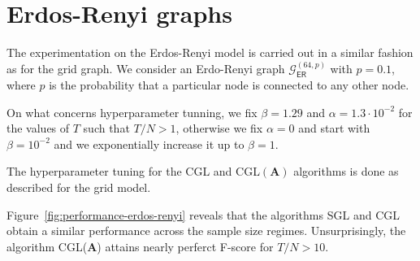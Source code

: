 \section{Erdos-Renyi graphs}
The experimentation on the Erdos-Renyi model is carried out in a similar fashion
as for the grid graph. We consider an Erdo-Renyi graph $\mathcal{G}^{(64, p)}_{\mathsf{ER}}$
with $p = 0.1$, where $p$ is the probability that a particular node is connected to any other node.

On what concerns hyperparameter tunning, we fix $\beta = 1.29$ and $\alpha = 1.3\cdot 10^{-2}$
for the values of $T$ such that $T / N > 1$, otherwise we fix $\alpha = 0$ and start with
$\beta = 10^{-2}$ and we exponentially increase it up to $\beta = 1$.

The hyperparameter tuning for the \textsf{CGL} and \textsf{CGL}$(\mathbf{A})$ algorithms
is done as described for the grid model.

Figure~\ref{fig:performance-erdos-renyi} reveals that the algorithms \textsf{SGL}
and \textsf{CGL} obtain a similar performance across the sample size regimes. Unsurprisingly,
the algorithm \textsf{CGL}($\mathbf{A}$) attains nearly perferct F-score for $T / N > 10$.

